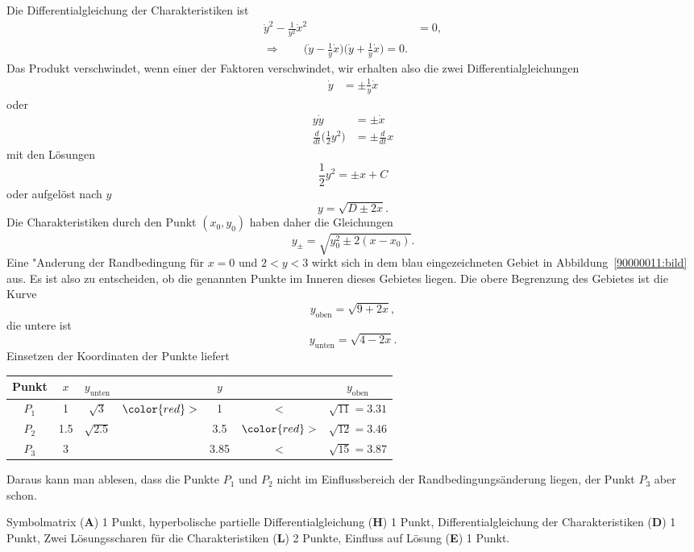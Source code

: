 \begin{loesung}
Die Differentialgleichung der Charakteristiken ist
\begin{align*}
\dot y^2-\frac{1}{y^2}\dot x^2&=0,\\
\Rightarrow\qquad
\biggl(\dot y-\frac1y\dot x\biggr)\biggl(\dot y +\frac1y\dot x\biggr)=0.
\end{align*}
Das Produkt verschwindet, wenn einer der Faktoren verschwindet, wir erhalten
also die zwei Differentialgleichungen
\begin{align*}
\dot y&=\pm \frac1y \dot x
\end{align*}
oder
\begin{align*}
y\dot y&=\pm \dot x
\\
\frac{d}{dt}\biggl(\frac12y^2\biggr)&=\pm\frac{d}{dt} x
\end{align*}
mit den Lösungen
\[
\frac12y^2=\pm x + C
\]
oder aufgelöst nach $y$
\begin{equation}
y=\sqrt{D\pm 2x}.
\end{equation}
Die Charakteristiken durch den Punkt $(x_0,y_0)$ haben daher die Gleichungen
\[
y_\pm=\sqrt{y_0^2\pm 2(x-x_0)}.
\]
Eine "Anderung der Randbedingung für $x=0$ und $2<y<3$ wirkt sich 
in dem blau eingezeichneten Gebiet in Abbildung~\ref{90000011:bild} aus.
Es ist also zu entscheiden, ob die genannten Punkte im Inneren dieses
Gebietes liegen. Die obere Begrenzung des Gebietes ist die
Kurve
\[
y_{\text{oben}} = \sqrt{9+2x},
\]
die untere ist
\[
y_{\text{unten}} = \sqrt{4-2x}.
\]
Einsetzen der Koordinaten der Punkte liefert
\begin{center}
\begin{tabular}{|c|c|ccccc|}
\hline
Punkt&$x$&$y_{\text{unten}}$&               &$y$ &              & $y_{\text{oben}}$\\
\hline
$P_1$&1  &$\sqrt{3}  $      &$\color{red}>$ & 1  &     $<$      & $\sqrt{11}=3.31$ \\
$P_2$&1.5&$\sqrt{2.5}$      &               &3.5 &$\color{red}>$& $\sqrt{12}=3.46$ \\
$P_3$&3  &                  &               &3.85&     $<$      & $\sqrt{15}=3.87$ \\
\hline
\end{tabular}
\end{center}
Daraus kann man ablesen, dass die Punkte $P_1$ und $P_2$ nicht im Einflussbereich
der Randbedingungsänderung liegen, der Punkt $P_3$ aber schon.
\end{loesung}

\begin{bewertung}
Symbolmatrix ({\bf A}) 1 Punkt,
hyperbolische partielle Differentialgleichung ({\bf H}) 1 Punkt,
Differentialgleichung der Charakteristiken ({\bf D}) 1 Punkt,
Zwei Lösungsscharen für die Charakteristiken ({\bf L}) 2 Punkte,
Einfluss auf Lösung ({\bf E}) 1 Punkt.
\end{bewertung}



